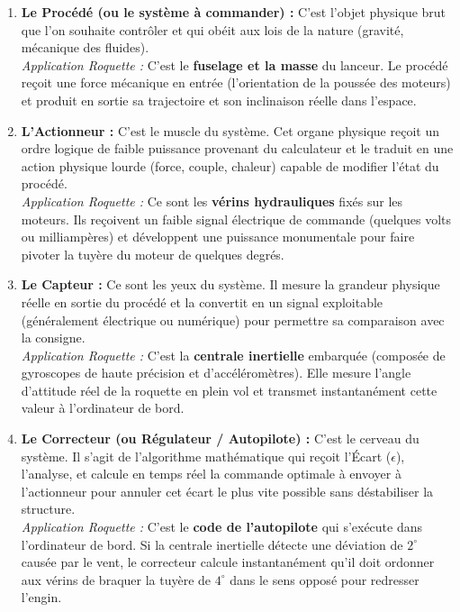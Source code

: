 \documentclass[11pt,a4paper]{report}
\begin{document}
\begin{enumerate}
    \item \textbf{Le Procédé (ou le système à commander) :} 
    C'est l'objet physique brut que l'on souhaite contrôler et qui obéit aux lois de la nature (gravité, mécanique des fluides). \\
    \textit{Application Roquette :} C'est le \textbf{fuselage et la masse} du lanceur. Le procédé reçoit une force mécanique en entrée (l'orientation de la poussée des moteurs) et produit en sortie sa trajectoire et son inclinaison réelle dans l'espace.
    
    \item \textbf{L'Actionneur :} 
    C'est le muscle du système. Cet organe physique reçoit un ordre logique de faible puissance provenant du calculateur et le traduit en une action physique lourde (force, couple, chaleur) capable de modifier l'état du procédé. \\
    \textit{Application Roquette :} Ce sont les \textbf{vérins hydrauliques} fixés sur les moteurs. Ils reçoivent un faible signal électrique de commande (quelques volts ou milliampères) et développent une puissance monumentale pour faire pivoter la tuyère du moteur de quelques degrés.
    
    \item \textbf{Le Capteur :} 
    Ce sont les yeux du système. Il mesure la grandeur physique réelle en sortie du procédé et la convertit en un signal exploitable (généralement électrique ou numérique) pour permettre sa comparaison avec la consigne. \\
    \textit{Application Roquette :} C'est la \textbf{centrale inertielle} embarquée (composée de gyroscopes de haute précision et d'accéléromètres). Elle mesure l'angle d'attitude réel de la roquette en plein vol et transmet instantanément cette valeur à l'ordinateur de bord.
    
    \item \textbf{Le Correcteur (ou Régulateur / Autopilote) :} 
    C'est le cerveau du système. Il s'agit de l'algorithme mathématique qui reçoit l'Écart ($\epsilon$), l'analyse, et calcule en temps réel la commande optimale à envoyer à l'actionneur pour annuler cet écart le plus vite possible sans déstabiliser la structure. \\
    \textit{Application Roquette :} C'est le \textbf{code de l'autopilote} qui s'exécute dans l'ordinateur de bord. Si la centrale inertielle détecte une déviation de $2^\circ$ causée par le vent, le correcteur calcule instantanément qu'il doit ordonner aux vérins de braquer la tuyère de $4^\circ$ dans le sens opposé pour redresser l'engin.
\end{enumerate}
\end{document}
